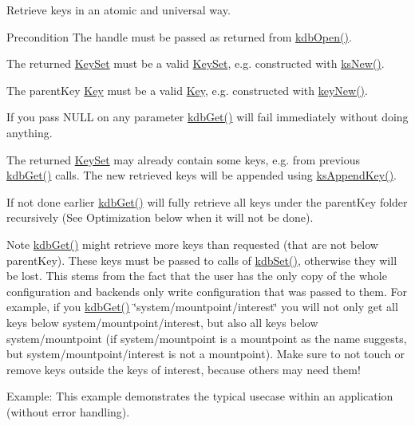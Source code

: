 Retrieve keys in an atomic and universal way. \begin{DoxyPrecond}{Precondition}
The {\ttfamily handle} must be passed as returned from \hyperlink{group__kdb_ga6808defe5870f328dd17910aacbdc6ca}{kdb\+Open()}.

The {\ttfamily returned} \hyperlink{classkdb_1_1KeySet}{Key\+Set} must be a valid \hyperlink{classkdb_1_1KeySet}{Key\+Set}, e.\+g. constructed with \hyperlink{group__keyset_ga671e1aaee3ae9dc13b4834a4ddbd2c3c}{ks\+New()}.

The {\ttfamily parent\+Key} \hyperlink{classkdb_1_1Key}{Key} must be a valid \hyperlink{classkdb_1_1Key}{Key}, e.\+g. constructed with \hyperlink{group__key_gad23c65b44bf48d773759e1f9a4d43b89}{key\+New()}.
\end{DoxyPrecond}
If you pass N\+U\+LL on any parameter \hyperlink{group__kdb_ga28e385fd9cb7ccfe0b2f1ed2f62453a1}{kdb\+Get()} will fail immediately without doing anything.

The {\ttfamily returned} \hyperlink{classkdb_1_1KeySet}{Key\+Set} may already contain some keys, e.\+g. from previous \hyperlink{group__kdb_ga28e385fd9cb7ccfe0b2f1ed2f62453a1}{kdb\+Get()} calls. The new retrieved keys will be appended using \hyperlink{group__keyset_gaa5a1d467a4d71041edce68ea7748ce45}{ks\+Append\+Key()}.

If not done earlier \hyperlink{group__kdb_ga28e385fd9cb7ccfe0b2f1ed2f62453a1}{kdb\+Get()} will fully retrieve all keys under the {\ttfamily parent\+Key} folder recursively (See Optimization below when it will not be done).

\begin{DoxyNote}{Note}
\hyperlink{group__kdb_ga28e385fd9cb7ccfe0b2f1ed2f62453a1}{kdb\+Get()} might retrieve more keys than requested (that are not below parent\+Key). These keys must be passed to calls of \hyperlink{group__kdb_ga11436b058408f83d303ca5e996832bcf}{kdb\+Set()}, otherwise they will be lost. This stems from the fact that the user has the only copy of the whole configuration and backends only write configuration that was passed to them. For example, if you \hyperlink{group__kdb_ga28e385fd9cb7ccfe0b2f1ed2f62453a1}{kdb\+Get()} \char`\"{}system/mountpoint/interest\char`\"{} you will not only get all keys below system/mountpoint/interest, but also all keys below system/mountpoint (if system/mountpoint is a mountpoint as the name suggests, but system/mountpoint/interest is not a mountpoint). Make sure to not touch or remove keys outside the keys of interest, because others may need them!
\end{DoxyNote}
\begin{DoxyParagraph}{Example\+:}
This example demonstrates the typical usecase within an application (without error handling).
\end{DoxyParagraph}

